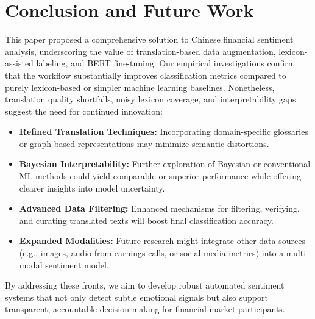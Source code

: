 \documentclass[12pt]{article}
\begin{document}
\section{Conclusion and Future Work}
\label{sec:conclusion}

This paper proposed a comprehensive solution to Chinese financial sentiment analysis, underscoring the value of translation-based data augmentation, lexicon-assisted labeling, and BERT fine-tuning. Our empirical investigations confirm that the workflow substantially improves classification metrics compared to purely lexicon-based or simpler machine learning baselines. Nonetheless, translation quality shortfalls, noisy lexicon coverage, and interpretability gaps suggest the need for continued innovation:

\begin{itemize}
    \item \textbf{Refined Translation Techniques:} Incorporating domain-specific glossaries or graph-based representations may minimize semantic distortions.
    \item \textbf{Bayesian Interpretability:} Further exploration of Bayesian or conventional ML methods could yield comparable or superior performance while offering clearer insights into model uncertainty.
    \item \textbf{Advanced Data Filtering:} Enhanced mechanisms for filtering, verifying, and curating translated texts will boost final classification accuracy.
    \item \textbf{Expanded Modalities:} Future research might integrate other data sources (e.g., images, audio from earnings calls, or social media metrics) into a multi-modal sentiment model.
\end{itemize}

By addressing these fronts, we aim to develop robust automated sentiment systems that not only detect subtle emotional signals but also support transparent, accountable decision-making for financial market participants.

\end{document}
